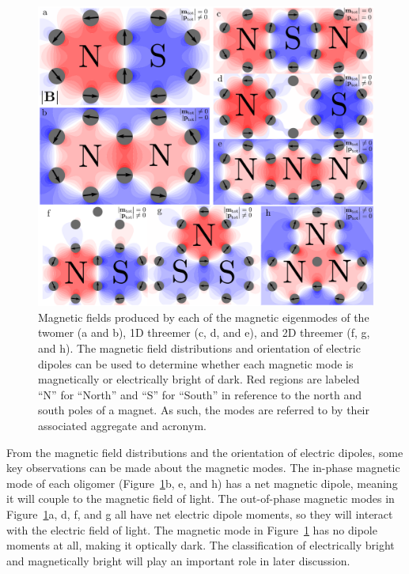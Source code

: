 \documentclass[journal=apchd5,manuscript=article]{achemso}
\begin{document}
\begin{figure}
\includegraphics[width=7in]{fields_new_arrows.pdf}
\caption{Magnetic fields produced by each of the magnetic eigenmodes of the twomer (a and b), 1D threemer (c, d, and e), and 2D threemer (f, g, and h). The magnetic field distributions and orientation of electric dipoles can be used to determine whether each magnetic mode is magnetically or electrically bright of dark. Red regions are labeled ``N'' for ``North'' and ``S'' for ``South'' in reference to the north and south poles of a magnet. As such, the modes are referred to by their associated aggregate and acronym.}
\label{field_plots}
\end{figure}

From the magnetic field distributions and the orientation of electric dipoles, some key observations can be made about the magnetic modes. The in-phase magnetic mode of each oligomer (Figure~\ref{field_plots}b, e, and h) has a net magnetic dipole, meaning it will couple to the magnetic field of light. The out-of-phase magnetic modes in Figure~\ref{field_plots}a, d, f, and g all have net electric dipole moments, so they will interact with the electric field of light. The magnetic mode in Figure~\ref{field_plots} has no dipole moments at all, making it optically dark. The classification of electrically bright and magnetically bright will play an important role in later discussion.
\end{document}
